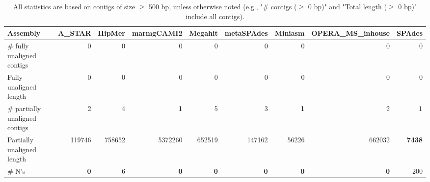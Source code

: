 \documentclass[12pt,a4paper]{article}
\begin{document}
\begin{table}[ht]
\begin{center}
\caption{All statistics are based on contigs of size $\geq$ 500 bp, unless otherwise noted (e.g., "\# contigs ($\geq$ 0 bp)" and "Total length ($\geq$ 0 bp)" include all contigs).}
\begin{tabular}{|l*{8}{|r}|}
\hline
Assembly & A\_STAR & HipMer & marmgCAMI2 & Megahit & metaSPAdes & Miniasm & OPERA\_MS\_inhouse & SPAdes \\ \hline
\# fully unaligned contigs & 0 & 0 & 0 & 0 & 0 & 0 & 0 & 0 \\ \hline
Fully unaligned length & 0 & 0 & 0 & 0 & 0 & 0 & 0 & 0 \\ \hline
\# partially unaligned contigs & 2 & 4 & {\bf 1} & 5 & 3 & {\bf 1} & 2 & {\bf 1} \\ \hline
Partially unaligned length & 119746 & 758652 & 5372260 & 652519 & 147162 & 56226 & 662032 & {\bf 7438} \\ \hline
\# N's & {\bf 0} & 6 & {\bf 0} & {\bf 0} & {\bf 0} & {\bf 0} & {\bf 0} & 200 \\ \hline
\end{tabular}
\end{center}
\end{table}
\end{document}

